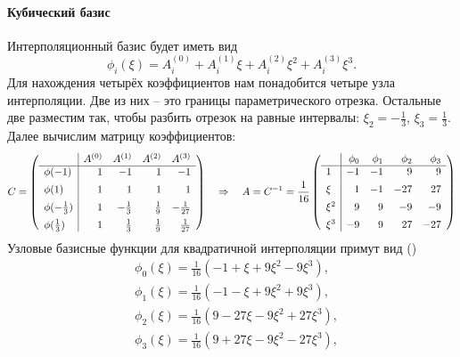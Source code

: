 \paragraph{Кубический базис}
Интерполяционный базис будет иметь вид
$$
\phi_i(\xi) = A_i^{(0)} + A_i^{(1)} \xi + A_i^{(2)} \xi^2 + A_i^{(3)} \xi^3.
$$
Для нахождения четырёх коэффициентов нам понадобится четыре узла интерполяции.
Две из них -- это границы параметрического отрезка. Остальные две разместим
так, чтобы разбить отрезок на равные интервалы:
$\xi_2 = -\tfrac13$, $\xi_3 = \tfrac13$.
Далее вычислим матрицу коэффициентов:
$$
C =
\left(
\begin{array}{l|rrrr}
                &  A^{(0)}  &  A^{(1)}      & A^{(2)}     & A^{(3)}         \\
\hline
\phi(-1)        &  1  & -1        & 1         &  -1           \\[5pt]
\phi( 1)        &  1  & 1         & 1         &   1           \\[5pt]
\phi(-\tfrac13) &  1  & -\tfrac13 & \tfrac19  &  -\tfrac1{27} \\[5pt]
\phi(\tfrac13)  &  1  &  \tfrac13 & \tfrac19  &   \tfrac1{27}
\end{array}
\right)
\quad\Rightarrow\quad
A = C^{-1} =
\frac{1}{16}
\left(
\begin{array}{l|rrrr}
      & \phi_0 & \phi_1 & \phi_2 & \phi_3 \\
\hline
1     & -1     & -1     &   9    &  9     \\[5pt]
\xi   &  1     & -1     & -27    &  27    \\[5pt]
\xi^2 &  9     &  9     & -9     & -9     \\[5pt]
\xi^3 & -9     &  9     &  27    & -27   
\end{array}
\right)
$$
Узловые базисные функции для квадратичной интерполяции примут вид ()
\begin{equation}
\label{eq:segment_cubic_basis}
\begin{aligned}
&\phi_0(\xi) = \frac{1}{16}\left(-1 + \xi + 9 \xi^2 -9 \xi^3\right), \\
&\phi_1(\xi) = \frac{1}{16}\left(-1 - \xi + 9 \xi^2 +9 \xi^3\right), \\
&\phi_2(\xi) = \frac{1}{16}\left(9 -27 \xi - 9\xi^2 + 27 \xi^3\right), \\
&\phi_3(\xi) = \frac{1}{16}\left(9 +27 \xi - 9\xi^2 - 27 \xi^3\right), \\
\end{aligned}
\end{equation}

